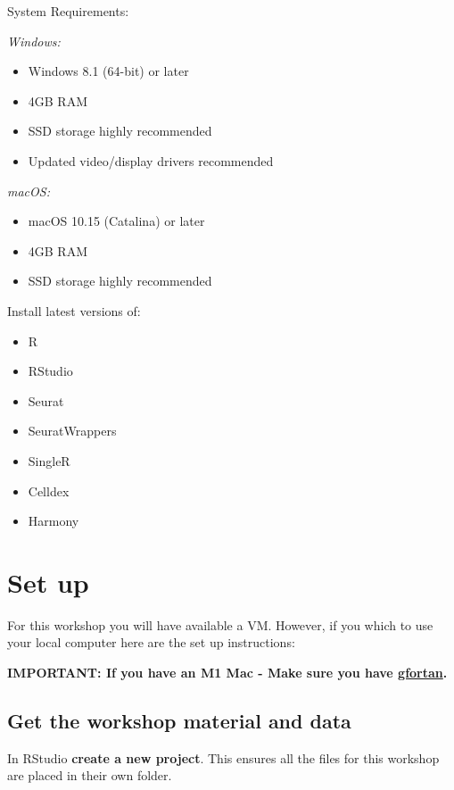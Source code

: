 \documentclass[
]{book}
\providecommand{\tightlist}{%
  \setlength{\itemsep}{0pt}\setlength{\parskip}{0pt}}
\begin{document}
System Requirements:

\emph{Windows:}

\begin{itemize}
\tightlist
\item
  Windows 8.1 (64-bit) or later
\item
  4GB RAM
\item
  SSD storage highly recommended
\item
  Updated video/display drivers recommended
\end{itemize}

\emph{macOS:}

\begin{itemize}
\tightlist
\item
  macOS 10.15 (Catalina) or later
\item
  4GB RAM
\item
  SSD storage highly recommended
\end{itemize}

Install latest versions of:

\begin{itemize}
\tightlist
\item
  R
\item
  RStudio
\item
  Seurat
\item
  SeuratWrappers
\item
  SingleR
\item
  Celldex
\item
  Harmony
\end{itemize}

\hypertarget{set-up}{%
\chapter{Set up}\label{set-up}}

For this workshop you will have available a VM. However, if you which to use your local computer here are the set up instructions:

\textbf{IMPORTANT: If you have an M1 Mac - Make sure you have \href{https://mac.r-project.org/tools/}{gfortan}.}

\hypertarget{get-the-workshop-material-and-data}{%
\section{Get the workshop material and data}\label{get-the-workshop-material-and-data}}

In RStudio \textbf{create a new project}. This ensures all the files for this workshop are placed in their own folder.
\end{document}
